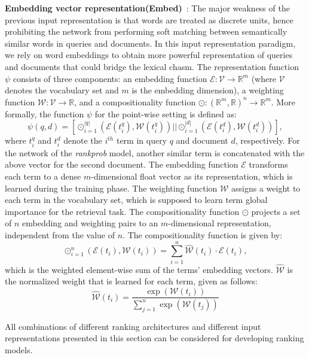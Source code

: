 \documentclass[sigconf]{acmart}
\newcommand{\modelthree}{\textit{rank\-prob} model\xspace}
\newcommand{\Feedthree}{Embedding vector representation\xspace}
\newcommand{\fthree}{Embed\xspace}
\def\:{\hskip0pt} \newcommand{\mypar}[1]{\vspace*{-0.1ex}\medskip\noindent\textbf{#1}~}
\begin{document}
\mypar{\label{sec:feedthree}\Feedthree (\fthree)}:
The major weakness of the previous input representation is that words are treated as discrete units, hence prohibiting the network from  performing soft matching between semantically similar words in queries and documents. In this input representation paradigm, we rely on word embeddings to obtain more powerful representation of queries and documents that could bridge the lexical chasm. The representation function $\psi$ consists of three components: an embedding function $\mathcal{E}: \mathcal{V} \rightarrow \mathbb{R}^{m}$ (where $\mathcal{V}$ denotes the vocabulary set and $m$ is the embedding dimension), a weighting function $\mathcal{W}: \mathcal{V} \rightarrow \mathbb{R}$, and a compositionality function $\odot: (\mathbb{R}^{m}, \mathbb{R})^n \rightarrow \mathbb{R}^{m}$. More formally, the function $\psi$ for the point-wise setting is defined as:
\begin{equation}
\psi(q, d) = [\odot_{i=1}^{|q|}(\mathcal{E}(t_i^q), \mathcal{W}(t_i^q)) || \odot_{i=1}^{|d|} (\mathcal{E}(t_i^d), \mathcal{W}(t_i^d))],
\end{equation}
where $t_i^q$ and $t_i^d$ denote the $i^{th}$ term in query $q$ and document $d$, respectively. 
For the network of the \modelthree, another similar term is concatenated with the above vector for the second document. The embedding function $\mathcal{E}$ transforms each term to a dense $m$-\:dimensional float vector as its representation, which is learned during the training phase. The weighting function $\mathcal{W}$ assigns a weight to each term in the vocabulary set, which is supposed to learn term global importance for the retrieval task. The compositionality function $\odot$ projects a set of $n$ embedding and weighting pairs to an $m$-\:dimensional representation, independent from the value of $n$. The compositionality function is given by:
\begin{equation}
\odot_{i=1}^n(\mathcal{E}(t_i), \mathcal{W}(t_i)) = \sum_{i=1}^n \widehat{\mathcal{W}}(t_i)\cdot \mathcal{E}(t_i),
\end{equation}
which is the weighted element-wise sum of the terms' embedding vectors. $\widehat{\mathcal{W}}$ is the normalized weight that is learned for each term, given as follows:
\begin{equation}
\widehat{\mathcal{W}}(t_i) = \frac{\exp(\mathcal{W}(t_i))}{\sum_{j=1}^n{ \exp(\mathcal{W}(t_j))}}
\end{equation}

\medskip
All combinations of different ranking architectures and different input representations presented in this section can be considered for developing ranking models.
\end{document}
